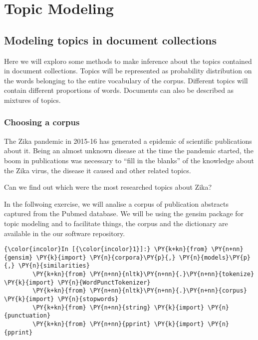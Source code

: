 \chapter{Topic Modeling}

    
    

    
    \section{Modeling topics in document
collections}\label{modeling-topics-in-document-collections}

Here we will exploro some methods to make inference about the topics
contained in document collections. Topics will be represented as
probability distribution on the words belonging to the entire vocabulary
of the corpus. Different topics will contain different proportions of
words. Documents can also be described as mixtures of topics.

    \subsection{Choosing a corpus}\label{choosing-a-corpus}

The Zika pandemic in 2015-16 has generated a epidemic of scientific
publications about it. Being an almost unknown disease at the time the
pandemic started, the boom in publications was necessary to ``fill in
the blanks'' of the knowledge about the Zika virus, the disease it
caused and other related topics.

Can we find out which were the most researched topics about Zika?

In the follwoing exercise, we will analise a corpus of publication
abstracts captured from the Pubmed database. We will be using the gensim
package for topic modeling and to facilitate things, the corpus and the
dictionary are available in the our software repository.

    \begin{Verbatim}[commandchars=\\\{\}]
{\color{incolor}In [{\color{incolor}1}]:} \PY{k+kn}{from} \PY{n+nn}{gensim} \PY{k}{import} \PY{n}{corpora}\PY{p}{,} \PY{n}{models}\PY{p}{,} \PY{n}{similarities}
        \PY{k+kn}{from} \PY{n+nn}{nltk}\PY{n+nn}{.}\PY{n+nn}{tokenize} \PY{k}{import} \PY{n}{WordPunctTokenizer}
        \PY{k+kn}{from} \PY{n+nn}{nltk}\PY{n+nn}{.}\PY{n+nn}{corpus} \PY{k}{import} \PY{n}{stopwords}
        \PY{k+kn}{from} \PY{n+nn}{string} \PY{k}{import} \PY{n}{punctuation}
        \PY{k+kn}{from} \PY{n+nn}{pprint} \PY{k}{import} \PY{n}{pprint}
\end{Verbatim}

